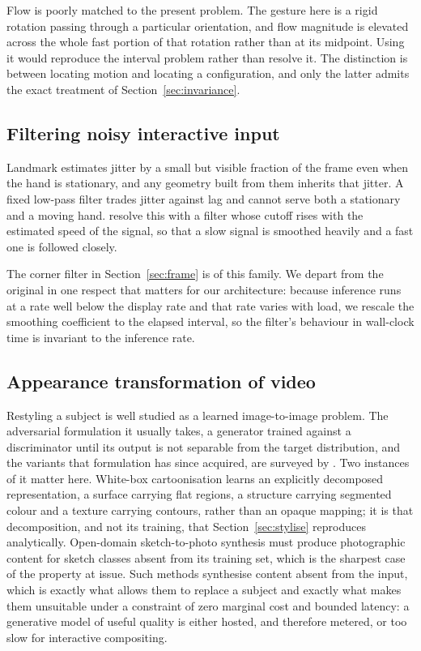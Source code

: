 \documentclass{article}
\theoremstyle{definition}
\begin{document}
Flow is poorly matched to the present problem. The gesture here is a rigid
rotation passing through a particular orientation, and flow magnitude is
elevated across the whole fast portion of that rotation rather than at its
midpoint. Using it would reproduce the interval problem rather than resolve it.
The distinction is between locating motion and locating a configuration, and
only the latter admits the exact treatment of Section~\ref{sec:invariance}.

\subsection{Filtering noisy interactive input}

Landmark estimates jitter by a small but visible fraction of the frame even when
the hand is stationary, and any geometry built from them inherits that jitter. A
fixed low-pass filter trades jitter against lag and cannot serve both a
stationary and a moving hand. \citet{casiez2012euro} resolve this with a filter
whose cutoff rises with the estimated speed of the signal, so that a slow signal
is smoothed heavily and a fast one is followed closely.

The corner filter in Section~\ref{sec:frame} is of this family. We depart from
the original in one respect that matters for our architecture: because inference
runs at a rate well below the display rate and that rate varies with load, we
rescale the smoothing coefficient to the elapsed interval, so the filter's
behaviour in wall-clock time is invariant to the inference rate.

\subsection{Appearance transformation of video}

Restyling a subject is well studied as a learned image-to-image problem. The
adversarial formulation it usually takes, a generator trained against a
discriminator until its output is not separable from the target distribution,
and the variants that formulation has since acquired, are surveyed by
\citet{thakur2021gans}. Two instances of it matter here. White-box
cartoonisation \citep{thakur2021cartoonization} learns an explicitly decomposed
representation, a surface carrying flat regions, a structure carrying segmented
colour and a texture carrying contours, rather than an opaque mapping; it is that
decomposition, and not its training, that Section~\ref{sec:stylise} reproduces
analytically. Open-domain sketch-to-photo synthesis \citep{thakur2021aoda} must
produce photographic content for sketch classes absent from its training set,
which is the sharpest case of the property at issue. Such methods synthesise
content absent from the input, which is exactly what allows them to replace a
subject and exactly what makes them unsuitable under a constraint of zero
marginal cost and bounded latency: a generative model of useful quality is either
hosted, and therefore metered, or too slow for interactive compositing.
\end{document}
